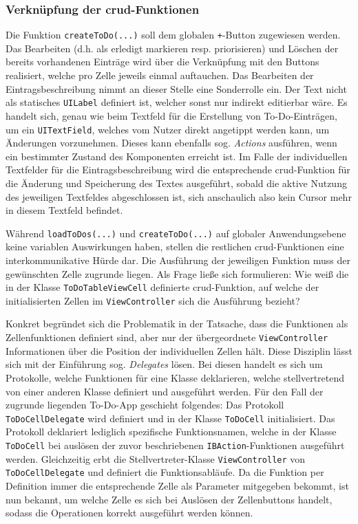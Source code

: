 \subsubsection{Verknüpfung der \ac{crud}-Funktionen}

Die Funktion \texttt{createToDo(...)} soll dem globalen \texttt{+}-Button zugewiesen werden. Das Bearbeiten (d.h. als erledigt markieren resp. priorisieren) und Löschen der bereits vorhandenen Einträge wird über die Verknüpfung mit den Buttons realisiert, welche pro Zelle jeweils einmal auftauchen. Das Bearbeiten der Eintragsbeschreibung nimmt an dieser Stelle eine Sonderrolle ein. Der Text nicht als statisches \texttt{UILabel} definiert ist, welcher sonst nur indirekt editierbar wäre. Es handelt sich, genau wie beim Textfeld für die Erstellung von To-Do-Einträgen, um ein \texttt{UITextField}, welches vom Nutzer direkt angetippt werden kann, um Änderungen vorzunehmen. Dieses kann ebenfalls sog. \textit{Actions} ausführen, wenn ein bestimmter Zustand des Komponenten erreicht ist. Im Falle der individuellen Textfelder für die Eintragsbeschreibung wird die entsprechende \ac{crud}-Funktion für die Änderung und Speicherung des Textes ausgeführt, sobald die aktive Nutzung des jeweiligen Textfeldes abgeschlossen ist, sich anschaulich also kein Cursor mehr in diesem Textfeld befindet.

Während \texttt{loadToDos(...)} und \texttt{createToDo(...)} auf globaler Anwendungsebene keine variablen Auswirkungen haben, stellen die restlichen \ac{crud}-Funktionen eine interkommunikative Hürde dar. Die Ausführung der jeweiligen Funktion muss der gewünschten Zelle zugrunde liegen. Als Frage ließe sich formulieren: Wie weiß die in der Klasse \texttt{ToDoTableViewCell} definierte \ac{crud}-Funktion, auf welche der initialisierten Zellen im \texttt{ViewController} sich die Ausführung bezieht?

Konkret begründet sich die Problematik in der Tatsache, dass die Funktionen als Zellenfunktionen definiert sind, aber nur der übergeordnete \texttt{ViewController} Informationen über die Position der individuellen Zellen hält. Diese Disziplin lässt sich mit der Einführung sog. \textit{Delegates} lösen. Bei diesen handelt es sich um Protokolle, welche Funktionen für eine Klasse deklarieren, welche stellvertretend von einer anderen Klasse definiert und ausgeführt werden. Für den Fall der zugrunde liegenden To-Do-App geschieht folgendes: Das Protokoll \texttt{ToDoCellDelegate} wird definiert und in der Klasse \texttt{ToDoCell} initialisiert. Das Protokoll deklariert lediglich spezifische Funktionsnamen, welche in der Klasse \texttt{ToDoCell} bei auslösen der zuvor beschriebenen \texttt{IBAction}-Funktionen ausgeführt werden. Gleichzeitig erbt die Stellvertreter-Klasse \texttt{ViewController} von \texttt{ToDoCellDelegate} und definiert die Funktionsabläufe. Da die Funktion per Definition immer die entsprechende Zelle als Parameter mitgegeben bekommt, ist nun bekannt, um welche Zelle es sich bei Auslösen der Zellenbuttons handelt, sodass die Operationen korrekt ausgeführt werden können.

